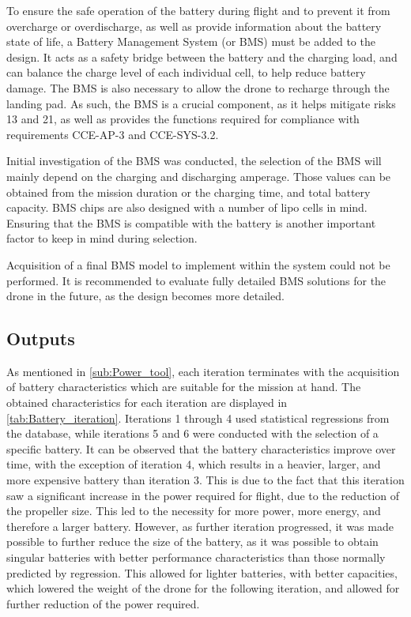 To ensure the safe operation of the battery during flight and to prevent it from overcharge or overdischarge, as well as provide information about the battery state of life, a Battery Management System (or BMS) must be added to the design. It acts as a safety bridge between the battery and the charging load, and can balance the charge level of each individual cell, to help reduce battery damage. The BMS is also necessary to allow the drone to recharge through the landing pad. As such, the BMS is a crucial component, as it helps mitigate risks 13 and 21, as well as provides the functions required for compliance with requirements CCE-AP-3 and CCE-SYS-3.2.

Initial investigation of the BMS was conducted, the selection of the BMS will mainly depend on the charging and discharging amperage. Those values can be obtained from the mission duration or the charging time, and total battery capacity. BMS chips are also designed with a number of lipo cells in mind. Ensuring that the BMS is compatible with the battery is another important factor to keep in mind during selection.

Acquisition of a final BMS model to implement within the system could not be performed. It is recommended to evaluate fully detailed BMS solutions for the drone in the future, as the design becomes more detailed.

\subsection{Outputs} %
\label{sub:poweroutputs}

As mentioned in \autoref{sub:Power_tool}, each iteration terminates with the acquisition of battery characteristics which are suitable for the mission at hand. The obtained characteristics for each iteration are displayed in \autoref{tab:Battery_iteration}. Iterations 1 through 4 used statistical regressions from the database, while iterations 5 and 6 were conducted with the selection of a specific battery. It can be observed that the battery characteristics improve over time, with the exception of iteration 4, which results in a heavier, larger, and more expensive battery than iteration 3. This is due to the fact that this iteration saw a significant increase in the power required for flight, due to the reduction of the propeller size. This led to the necessity for more power, more energy, and therefore a larger battery. However, as further iteration progressed, it was made possible to further reduce the size of the battery, as it was possible to obtain singular batteries with better performance characteristics than those normally predicted by regression. This allowed for lighter batteries, with better capacities, which lowered the weight of the drone for the following iteration, and allowed for further reduction of the power required.


